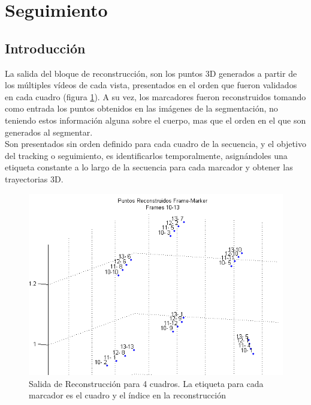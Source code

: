 \section{Seguimiento}

\subsection{Introducción}

La salida del bloque de reconstrucción, son los puntos 3D generados a partir de los múltiples vídeos de cada vista, presentados en el orden que fueron validados en cada cuadro (figura \ref{reconstr_00}). A su vez, los marcadores fueron reconstruidos tomando como entrada los puntos obtenidos en las imágenes de la segmentación, no teniendo estos información alguna sobre el cuerpo, mas que el orden en el que son generados al segmentar.
\\ 

Son presentados sin orden definido para cada cuadro de la secuencia, y el objetivo del tracking o seguimiento, es identificarlos temporalmente, asignándoles una etiqueta constante a lo largo de la secuencia para cada marcador y obtener las trayectorias 3D.

\begin{figure}[hbt]
\begin{center}
\includegraphics[scale=0.8]{img/Tracking/00_Salida_Reconstruccion.png}
\end{center}
\caption{Salida de Reconstrucción para 4 cuadros. La etiqueta para cada marcador es el cuadro y el índice en la reconstrucción}
\label{reconstr_00}
\end{figure}

